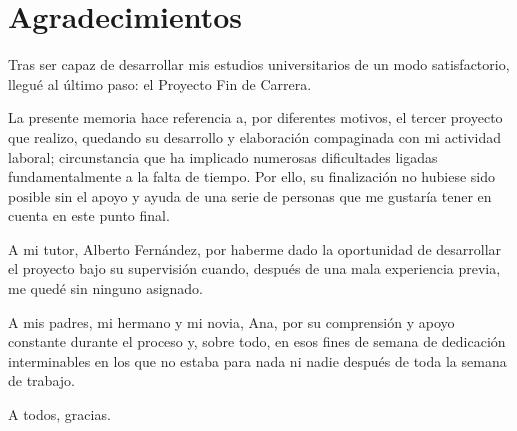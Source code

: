 \chapter{Agradecimientos}

Tras ser capaz de desarrollar mis estudios universitarios de un modo satisfactorio, llegué al último paso: el Proyecto Fin de Carrera.

La presente memoria hace referencia a, por diferentes motivos, el tercer proyecto que realizo, quedando su desarrollo y elaboración compaginada con mi actividad laboral; circunstancia que ha implicado numerosas dificultades ligadas fundamentalmente a la falta de tiempo. Por ello, su finalización no hubiese sido posible sin el apoyo y ayuda de una serie de personas que me gustaría tener en cuenta en este punto final.

A mi tutor, Alberto Fernández, por haberme dado la oportunidad de desarrollar el proyecto bajo su supervisión cuando, después de una mala experiencia previa, me quedé sin ninguno asignado.

A mis padres, mi hermano y mi novia, Ana, por su comprensión y apoyo constante durante el proceso y, sobre todo, en esos fines de semana de dedicación interminables en los que no estaba para nada ni nadie después de toda la semana de trabajo.

A todos, gracias.